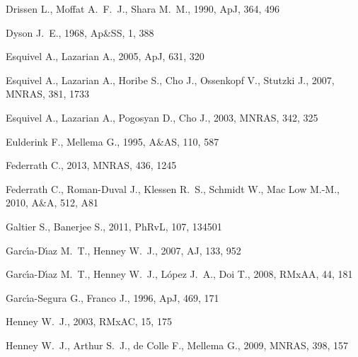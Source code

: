 \documentclass[useAMS,usenatbib]{mn2e}
\begin{document}
\begin{thebibliography}{}
 Drissen L., Moffat A.~F.~J., Shara M.~M., 1990, ApJ, 364, 496 

 Dyson J.~E., 1968, Ap\&SS, 1, 388 

 Esquivel A., Lazarian A., 2005, ApJ, 631, 320 

 Esquivel A., Lazarian A., Horibe S., Cho 
J., Ossenkopf V., Stutzki J., 2007, MNRAS, 381, 1733 

 Esquivel A., Lazarian A., Pogosyan D., Cho 
J., 2003, MNRAS, 342, 325 

 Eulderink F., Mellema G.,
  1995, A\&AS, 110, 587 

Federrath C., 2013, MNRAS, 436, 1245 

 Federrath C., Roman-Duval J., Klessen R.~S., Schmidt W., Mac Low M.-M., 2010, A\&A, 512, A81 

 Galtier S., Banerjee S., 2011, PhRvL, 107, 134501 

 Garc{\'{\i}}a-D{\'{\i}}az M.~T., Henney W.~J., 2007, AJ, 133, 952 

 Garc{\'{\i}}a-D{\'{\i}}az M.~T., Henney 
W.~J., L{\'o}pez J.~A., Doi T., 2008, RMxAA, 44, 181 

 Garc\'{\i}a-Segura G., Franco J., 1996, ApJ, 469, 171 

  Henney W.~J., 2003, RMxAC, 15, 175 

Henney W.~J., Arthur S.~J., de Colle F., Mellema G., 2009, MNRAS, 398, 157 


\end{thebibliography}
\end{document}
